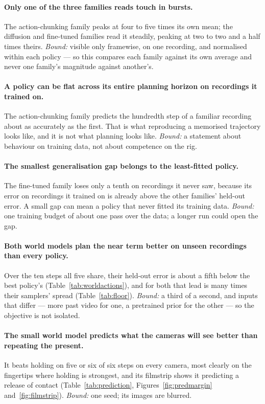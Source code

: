 \paragraph{\textbf{Only one of the three families reads touch in bursts.}}
The action-chunking family peaks at four to five times its own mean; the
diffusion and fine-tuned families read it steadily, peaking at two to two and
a half times theirs. \emph{Bound:} visible only framewise, on one recording,
and normalised within each policy --- so this compares each family against its
own average and never one family's magnitude against another's.

\paragraph{\textbf{A policy can be flat across its entire planning horizon on
recordings it trained on.}} The action-chunking family predicts the hundredth
step of a familiar recording about as accurately as the first. That is what
reproducing a memorised trajectory looks like, and it is not what planning
looks like. \emph{Bound:} a statement about behaviour on training data, not
about competence on the rig.

\paragraph{\textbf{The smallest generalisation gap belongs to the least-fitted
policy.}} The fine-tuned family loses only a tenth on recordings it never saw,
because its error on recordings it trained on is already above the other
families' held-out error. A small gap can mean a policy that never fitted its
training data. \emph{Bound:} one training budget of about one pass over the
data; a longer run could open the gap.

\paragraph{\textbf{Both world models plan the near term better on unseen
recordings than every policy.}} Over the ten steps all five share, their
held-out error is about a fifth below the best policy's
(Table~\ref{tab:worldactions}), and for both that lead is many times their
samplers' spread (Table~\ref{tab:floor}). \emph{Bound:} a third of
a second, and inputs that differ --- more past video for one, a pretrained
prior for the other --- so the objective is not isolated.

\paragraph{\textbf{The small world model predicts what the cameras will see
better than repeating the present.}} It beats holding on five or six of six
steps on every camera, most clearly on the fingertips where holding is
strongest, and its filmstrip shows it predicting a release of contact
(Table~\ref{tab:prediction}, Figures~\ref{fig:predmargin}
and~\ref{fig:filmstrip}). \emph{Bound:} one seed; its images are blurred.

